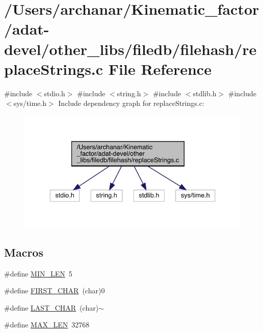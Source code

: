 \hypertarget{adat-devel_2other__libs_2filedb_2filehash_2replaceStrings_8c}{}\section{/\+Users/archanar/\+Kinematic\+\_\+factor/adat-\/devel/other\+\_\+libs/filedb/filehash/replace\+Strings.c File Reference}
\label{adat-devel_2other__libs_2filedb_2filehash_2replaceStrings_8c}
{\ttfamily \#include $<$stdio.\+h$>$}\newline
{\ttfamily \#include $<$string.\+h$>$}\newline
{\ttfamily \#include $<$stdlib.\+h$>$}\newline
{\ttfamily \#include $<$sys/time.\+h$>$}\newline
Include dependency graph for replace\+Strings.\+c\+:
\nopagebreak
\begin{figure}[H]
\begin{center}
\leavevmode
\includegraphics[width=336pt]{d9/dce/adat-devel_2other__libs_2filedb_2filehash_2replaceStrings_8c__incl}
\end{center}
\end{figure}
\subsection*{Macros}
\begin{DoxyCompactItemize}
\item 
\#define \mbox{\hyperlink{adat-devel_2other__libs_2filedb_2filehash_2replaceStrings_8c_aa69f8dba9add1a52ce3cf7bcfafcfda0}{M\+I\+N\+\_\+\+L\+EN}}~5
\item 
\#define \mbox{\hyperlink{adat-devel_2other__libs_2filedb_2filehash_2replaceStrings_8c_af1c5fd90d1b8a22169133f549223f2e1}{F\+I\+R\+S\+T\+\_\+\+C\+H\+AR}}~(char)\textquotesingle{}0\textquotesingle{}
\item 
\#define \mbox{\hyperlink{adat-devel_2other__libs_2filedb_2filehash_2replaceStrings_8c_a31911f021a0d09eed9a5269d0648dfde}{L\+A\+S\+T\+\_\+\+C\+H\+AR}}~(char)\textquotesingle{}$\sim$\textquotesingle{}
\item 
\#define \mbox{\hyperlink{adat-devel_2other__libs_2filedb_2filehash_2replaceStrings_8c_aabf4f709c8199e41cf279c77112345fe}{M\+A\+X\+\_\+\+L\+EN}}~32768
\end{DoxyCompactItemize}
